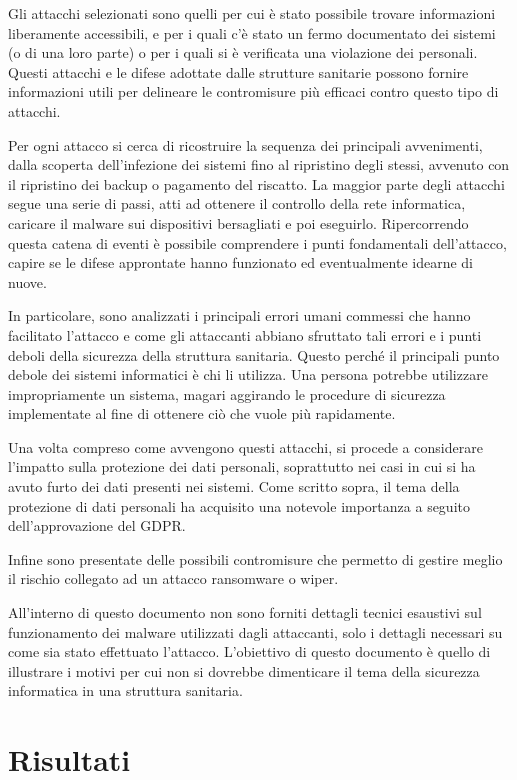 \documentclass[12pt]{article}
\begin{document}
Gli attacchi selezionati sono quelli per cui è stato possibile trovare informazioni liberamente accessibili, e per i quali c'è stato un fermo documentato dei sistemi (o di una loro parte) o per i quali si è verificata una violazione dei personali. Questi attacchi e le difese adottate dalle strutture sanitarie possono fornire informazioni utili per delineare le contromisure più efficaci contro questo tipo di attacchi.

Per ogni attacco si cerca di ricostruire la sequenza dei principali avvenimenti, dalla scoperta dell'infezione dei sistemi fino al ripristino degli stessi, avvenuto con il ripristino dei backup o pagamento del riscatto. La maggior parte degli attacchi segue una serie di passi, atti ad ottenere il controllo della rete informatica, caricare il malware sui dispositivi bersagliati e poi eseguirlo. Ripercorrendo questa catena di eventi è possibile comprendere i punti fondamentali dell'attacco, capire se le difese approntate hanno funzionato ed eventualmente idearne di nuove.

In particolare, sono analizzati i principali errori umani commessi che hanno facilitato l'attacco e come gli attaccanti abbiano sfruttato tali errori e i punti deboli della sicurezza della struttura sanitaria. Questo perché il principali punto debole dei sistemi informatici è chi li utilizza. Una persona potrebbe utilizzare impropriamente un sistema, magari aggirando le procedure di sicurezza implementate al fine di ottenere ciò che vuole più rapidamente.

Una volta compreso come avvengono questi attacchi, si procede a considerare l'impatto sulla protezione dei dati personali, soprattutto nei casi in cui si ha avuto furto dei dati presenti nei sistemi. Come scritto sopra, il tema della protezione di dati personali ha acquisito una notevole importanza a seguito dell'approvazione del GDPR. 

Infine sono presentate delle possibili contromisure che permetto di gestire meglio il rischio collegato ad un attacco ransomware o wiper.

All'interno di questo documento non sono forniti dettagli tecnici esaustivi sul funzionamento dei malware utilizzati dagli attaccanti, solo i dettagli necessari su come sia stato effettuato l'attacco. L'obiettivo di questo documento è quello di illustrare i motivi per cui non si dovrebbe dimenticare il tema della sicurezza informatica in una struttura sanitaria.

\section{Risultati}
\end{document}

